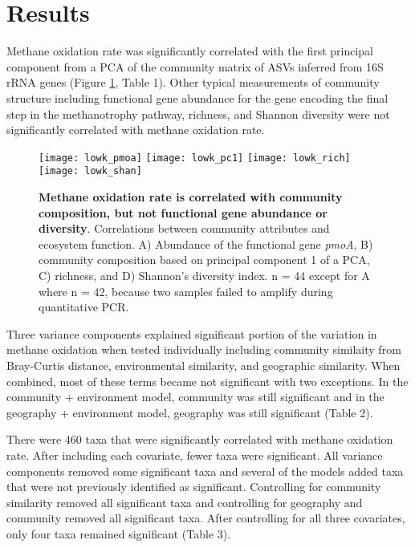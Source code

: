 \documentclass{article}
\begin{document}
\section{Results}

Methane oxidation rate was significantly correlated with the first principal
component from a PCA of the
community matrix of ASVs inferred from 16S rRNA genes (Figure
\ref{fig:corrs}, Table 1). Other typical
measurements of community structure including functional gene abundance for the
gene encoding the final step in the methanotrophy pathway, richness, and Shannon
diversity were not significantly correlated with methane oxidation rate.



\begin{figure}
\texttt{[image: lowk\_pmoa]}
\texttt{[image: lowk\_pc1]}
\texttt{[image: lowk\_rich]}
\texttt{[image: lowk\_shan]}
\caption{\label{fig:corrs}
  \textbf{Methane oxidation rate is correlated with community composition, but not
functional gene abundance or diversity}.
  Correlations between community attributes and ecosystem function. A) Abundance
  of the functional gene \textit{pmoA}, B) community composition based on
  principal component 1 of a PCA, C) richness, and D) Shannon's diversity index. n = 44 except
for A where n = 42, because two samples failed to amplify during quantitative
PCR.}
\end{figure}

Three variance components explained significant portion of the variation in methane
oxidation when tested individually including community similaity from
Bray-Curtis distance, environmental similarity, and geographic similarity. When
combined, most of these terms became not significant with two exceptions. In the
community + environment model, community was still significant and in the
geography + environment model, geography was still significant (Table 2). 



There were 460 taxa that were significantly correlated with methane oxidation
rate. After including each covariate, fewer taxa were significant. All variance
components removed some significant taxa and several of the models added taxa 
that were not previously
identified as significant. Controlling for community similarity removed all
significant taxa and controlling for geography and community removed all
significant taxa. After controlling for all three covariates, only four taxa
remained significant (Table 3). 
\end{document}
